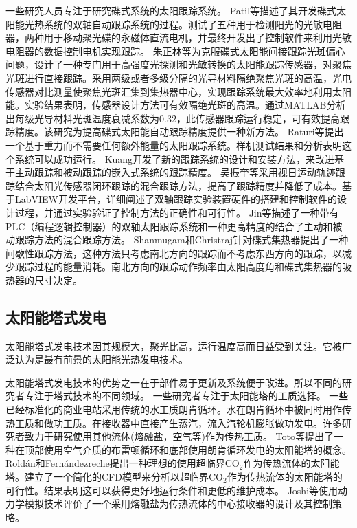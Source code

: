 一些研究人员专注于研究碟式系统的太阳跟踪系统。
Patil等\cite{Patil2016}描述了其开发碟式太阳能光热系统的双轴自动跟踪系统的过程。测试了五种用于检测阳光的光敏电阻器，两种用于移动聚光碟的永磁体直流电机，并最终开发出了控制软件来利用光敏电阻器的数据控制电机实现跟踪。
朱正林等\cite{Zhu2016}为克服碟式太阳能间接跟踪光斑偏心问题，设计了一种专门用于高强度光探测和光敏转换的太阳能跟踪传感器，对聚焦光斑进行直接跟踪。采用两级或者多级分隔的光导材料隔绝聚焦光斑的高温，光电传感器对比测量使聚焦光斑汇集到集热器中心，实现跟踪系统最大效率地利用太阳能。实验结果表明，传感器设计方法可有效隔绝光斑的高温。通过MATLAB分析出每级光导材料光斑温度衰减系数为0.32，此传感器跟踪运行稳定，可有效提高跟踪精度。该研究为提高碟式太阳能自动跟踪精度提供一种新方法。
Raturi等\cite{Raturi2014}提出一个基于重力而不需要任何额外能量的太阳跟踪系统。样机测试结果和分析表明这个系统可以成功运行。
Kuang\cite{Kuang2012}开发了新的跟踪系统的设计和安装方法，来改进基于主动跟踪和被动跟踪的嵌入式系统的跟踪精度。
吴振奎等\cite{Wu2015}采用视日运动轨迹跟踪结合太阳光传感器闭环跟踪的混合跟踪方法，提高了跟踪精度并降低了成本。基于LabVIEW开发平台，详细阐述了双轴跟踪实验装置硬件的搭建和控制软件的设计过程，并通过实验验证了控制方法的正确性和可行性。
Jin等\cite{Jin2013}描述了一种带有PLC（编程逻辑控制器）的双轴太阳跟踪系统和一种更高精度的结合了主动和被动跟踪方法的混合跟踪方法。
Shanmugam和Christraj\cite{Shanmugam2005}针对碟式集热器提出了一种间歇性跟踪方法，这种方法只考虑南北方向的跟踪而不考虑东西方向的跟踪，以减少跟踪过程的能量消耗。南北方向的跟踪动作频率由太阳高度角和碟式集热器的吸热器的尺寸决定。

\subsection{太阳能塔式发电}
\label{sec:st}

太阳能塔式发电技术因其规模大，聚光比高，运行温度高而日益受到关注。它被广泛认为是最有前景的太阳能光热发电技术。

太阳能塔式发电技术的优势之一在于部件易于更新及系统便于改进。所以不同的研究者专注于塔式技术的不同领域。
一些研究者专注于太阳能塔的工质选择。
一些已经标准化的商业电站采用传统的水工质朗肯循环\cite{Spiros2017}。水在朗肯循环中被同时用作传热工质和做功工质。在接收器中直接产生蒸汽，流入汽轮机膨胀做功发电\cite{Montes2009,Feldhoff2012,Steinmann2006,Yu2017,Gonzalez2017}。许多研究者致力于研究使用其他流体(熔融盐，空气等)作为传热工质。
Toto等\cite{Toro2016}提出了一种在顶部使用空气介质的布雷顿循环和底部使用朗肯循环发电的太阳能塔的概念。
Rold\'{a}n和Fern\'{a}ndezreche\cite{Rold2016}提出一种理想的使用超临界CO$_2$作为传热流体的太阳能塔。建立了一个简化的CFD模型来分析以超临界CO$_2$作为传热流体的太阳能塔的可行性。结果表明这可以获得更好地运行条件和更低的维护成本。
Joshi等\cite{Joshi2016}使用动力学模拟技术评价了一个采用熔融盐为传热流体的中心接收器的设计及其控制策略。

